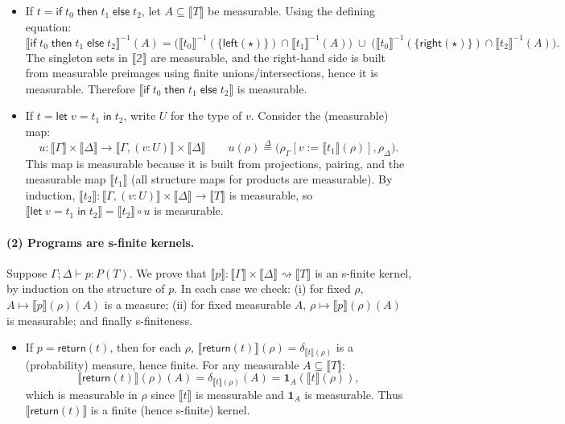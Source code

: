 \documentclass[preprint]{uai2026} %
\newcommand{\Bool}{\mathbb{2}}
\newcommand{\sem}[1]{\llbracket #1 \rrbracket}
\newcommand{\kto}{\rightsquigarrow}
\newcommand{\df}{\overset{\Delta}{=}}
\newcommand{\ifte}[3]{\mathsf{if}\;#1\;\mathsf{then}\;#2\;\mathsf{else}\;#3}
\newcommand{\letin}[3]{\mathsf{let}\;#1=#2\;\mathsf{in}\;#3}
\newcommand{\return}[1]{\mathsf{return}(#1)}
\begin{document}
\begin{proofE}
\begin{itemize}
\item If $t=\ifte{t_0}{t_1}{t_2}$, let $A\subseteq \sem{T}$ be measurable. Using the defining equation:
\[
\sem{\ifte{t_0}{t_1}{t_2}}^{-1}(A)
=
\Big(\sem{t_0}^{-1}(\{\mathsf{left}(\star)\})\cap \sem{t_1}^{-1}(A)\Big)
\;\cup\;
\Big(\sem{t_0}^{-1}(\{\mathsf{right}(\star)\})\cap \sem{t_2}^{-1}(A)\Big).
\]
The singleton sets in $\sem{\Bool}$ are measurable, and the right-hand side is built from measurable preimages using
finite unions/intersections, hence it is measurable. Therefore $\sem{\ifte{t_0}{t_1}{t_2}}$ is measurable.

\item If $t=\letin{v}{t_1}{t_2}$, write $U$ for the type of $v$. Consider the (measurable) map:
\[
u:\sem{\Gamma}\times\sem{\Delta}\to \sem{\Gamma,(v:U)}\times\sem{\Delta}\qquad
u(\rho)\df \big(\rho_\Gamma[v:=\sem{t_1}(\rho)],\rho_\Delta\big).
\]
This map is measurable because it is built from projections, pairing, and the measurable map $\sem{t_1}$ (all structure maps
for products are measurable). By induction, $\sem{t_2}:\sem{\Gamma,(v:U)}\times\sem{\Delta}\to \sem{T}$ is measurable,
so $\sem{\letin{v}{t_1}{t_2}}=\sem{t_2}\circ u$ is measurable.
\end{itemize}

\paragraph{(2) Programs are s-finite kernels.}
Suppose $\Gamma;\Delta \vdash p:P(T)$. We prove that $\sem{p}:\sem{\Gamma}\times\sem{\Delta}\kto \sem{T}$ is an s-finite kernel, by induction on the structure of $p$. In each case we check: (i) for fixed $\rho$, $A\mapsto \sem{p}(\rho)(A)$ is a measure; (ii) for fixed measurable $A$,
$\rho\mapsto \sem{p}(\rho)(A)$ is measurable; and finally s-finiteness.

\begin{itemize}
\item If $p=\return{t}$, then for each $\rho$, $\sem{\return{t}}(\rho)=\delta_{\sem{t}(\rho)}$ is a (probability) measure, hence finite.
For any measurable $A\subseteq \sem{T}$:
\[
\sem{\return{t}}(\rho)(A)=\delta_{\sem{t}(\rho)}(A)=\mathbf{1}_A(\sem{t}(\rho)),
\]
which is measurable in $\rho$ since $\sem{t}$ is measurable and $\mathbf{1}_A$ is measurable.
Thus $\sem{\return{t}}$ is a finite (hence s-finite) kernel.


\end{itemize}
\end{proofE}
\end{document}
